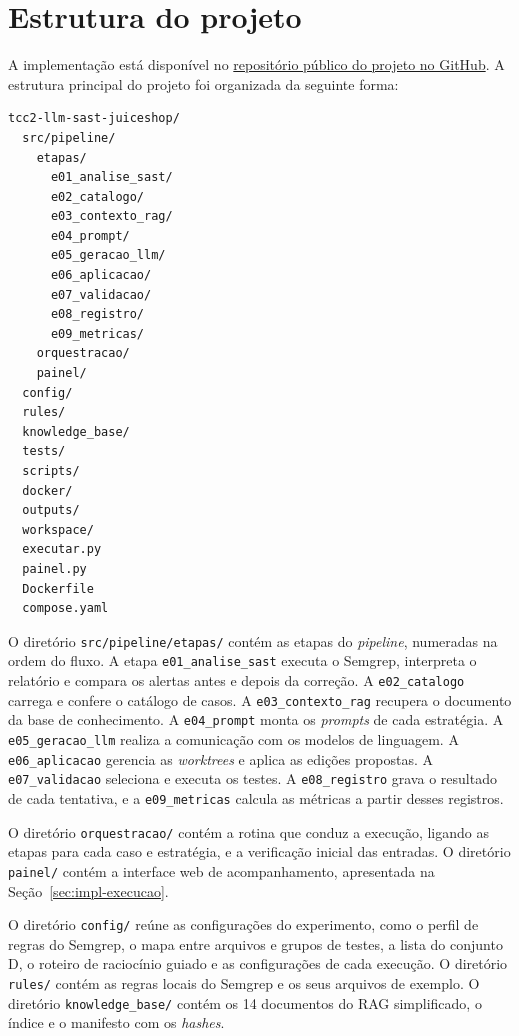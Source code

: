 \section{Estrutura do projeto}
\label{sec:impl-estrutura}

A implementação está disponível no \href{https://github.com/caiolamego/tcc2-llm-sast-juiceshop}{repositório público do projeto no GitHub}. A estrutura principal do projeto foi organizada da seguinte forma:

{\footnotesize
\begin{verbatim}
tcc2-llm-sast-juiceshop/
  src/pipeline/
    etapas/
      e01_analise_sast/
      e02_catalogo/
      e03_contexto_rag/
      e04_prompt/
      e05_geracao_llm/
      e06_aplicacao/
      e07_validacao/
      e08_registro/
      e09_metricas/
    orquestracao/
    painel/
  config/
  rules/
  knowledge_base/
  tests/
  scripts/
  docker/
  outputs/
  workspace/
  executar.py
  painel.py
  Dockerfile
  compose.yaml
\end{verbatim}
}

O diretório \texttt{src/pipeline/etapas/} contém as etapas do \textit{pipeline}, numeradas na ordem do fluxo. A etapa \texttt{e01\_analise\_sast} executa o Semgrep, interpreta o relatório e compara os alertas antes e depois da correção. A \texttt{e02\_catalogo} carrega e confere o catálogo de casos. A \texttt{e03\_contexto\_rag} recupera o documento da base de conhecimento. A \texttt{e04\_prompt} monta os \textit{prompts} de cada estratégia. A \texttt{e05\_geracao\_llm} realiza a comunicação com os modelos de linguagem. A \texttt{e06\_aplicacao} gerencia as \textit{worktrees} e aplica as edições propostas. A \texttt{e07\_validacao} seleciona e executa os testes. A \texttt{e08\_registro} grava o resultado de cada tentativa, e a \texttt{e09\_metricas} calcula as métricas a partir desses registros.

O diretório \texttt{orquestracao/} contém a rotina que conduz a execução, ligando as etapas para cada caso e estratégia, e a verificação inicial das entradas. O diretório \texttt{painel/} contém a interface web de acompanhamento, apresentada na Seção~\ref{sec:impl-execucao}.

O diretório \texttt{config/} reúne as configurações do experimento, como o perfil de regras do Semgrep, o mapa entre arquivos e grupos de testes, a lista do conjunto D, o roteiro de raciocínio guiado e as configurações de cada execução. O diretório \texttt{rules/} contém as regras locais do Semgrep e os seus arquivos de exemplo. O diretório \texttt{knowledge\_base/} contém os 14 documentos do RAG simplificado, o índice e o manifesto com os \textit{hashes}.

